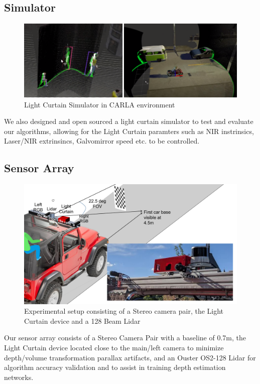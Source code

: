\subsection{Simulator}

\begin{figure}[h]
   \centering
   \begin{minipage}{0.4\textwidth}
       \centering
       \includegraphics[width=1.0\textwidth]{figures/sim.png}
   \end{minipage}\hfill
   \centering
   \caption{Light Curtain Simulator in CARLA environment}
\end{figure}
We also designed and open sourced a light curtain simulator \cite{raaj2019} to test and evaluate our algorithms, allowing for the Light Curtain paramters such as NIR instrinsics, Laser/NIR extrinsincs, Galvomirror speed etc. to be controlled.

\subsection{Sensor Array}

\begin{figure}[h]
   \centering
   \begin{minipage}{0.5\textwidth}
       \centering
       \includegraphics[width=1.0\textwidth]{figures/array.pdf}
   \end{minipage}\hfill
   \centering
   \caption{Experimental setup consisting of a Stereo camera pair, the Light Curtain device and a 128 Beam Lidar}
\end{figure}

Our sensor array consists of a Stereo Camera Pair with a baseline of 0.7m, the Light Curtain device located close to the main/left camera to minimize depth/volume transformation parallax artifacts, and an Ouster OS2-128 Lidar for algorithm accuracy validation and to assist in training depth estimation networks.